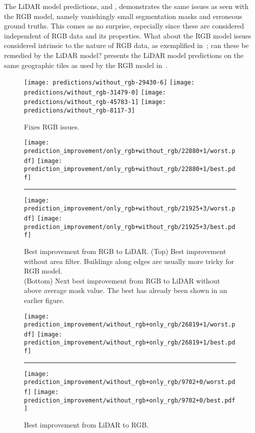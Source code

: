 The LiDAR model predictions,  and , demonstrates the same issues as seen with the RGB model, namely vanishingly small segmentation masks and erroneous ground truths.
This comes as no surprise, especially since these are considered independent of RGB data and its properties.
What about the RGB model issues considered intrinsic to the nature of RGB data, as exemplified in~; can these be remedied by the LiDAR model?
 presents the LiDAR model predictions on the same geographic tiles as used by the RGB model in~. %

\begin{figure}[H]
  \centering
  \texttt{[image: predictions/without\_rgb-29430-6]}  %
  \texttt{[image: predictions/without\_rgb-31479-0]}  %
  \texttt{[image: predictions/without\_rgb-45783-1]}  %
  \texttt{[image: predictions/without\_rgb-8117-3]}  %
  \caption{%
    Fixes RGB issues.
  }%
  \label{fig:lidar-corrected-rgb}
\end{figure}

\begin{figure}[H]
  \centering
  \texttt{[image: prediction\_improvement/only\_rgb+without\_rgb/22880+1/worst.pdf]}
  \texttt{[image: prediction\_improvement/only\_rgb+without\_rgb/22880+1/best.pdf]}
  \rule[1ex]{\textwidth}{.5pt}
  \texttt{[image: prediction\_improvement/only\_rgb+without\_rgb/21925+3/worst.pdf]}
  \texttt{[image: prediction\_improvement/only\_rgb+without\_rgb/21925+3/best.pdf]}
  \caption{%
    Best improvement from RGB to LiDAR.
    (Top) Best improvement without area filter. Buildings along edges are usually more tricky for RGB model.
    \\
    (Bottom) Next best improvement from RGB to LiDAR without above average mask value.
    The best has already been shown in an earlier figure.
  }%
  \label{fig:lidar-better-than-rgb}
\end{figure}

\begin{figure}[H]
  \centering
  \texttt{[image: prediction\_improvement/without\_rgb+only\_rgb/26819+1/worst.pdf]}
  \texttt{[image: prediction\_improvement/without\_rgb+only\_rgb/26819+1/best.pdf]}
  \rule[1ex]{\textwidth}{.5pt}
  \texttt{[image: prediction\_improvement/without\_rgb+only\_rgb/9702+0/worst.pdf]}
  \texttt{[image: prediction\_improvement/without\_rgb+only\_rgb/9702+0/best.pdf]}
  \caption{%
    Best improvement from LiDAR to RGB.
  }%
  \label{fig:rgb-better-than-lidar}
\end{figure}

